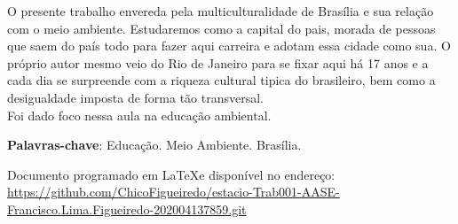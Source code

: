 
\setlength{\absparsep}{18pt} %
\begin{resumo}
 O presente trabalho envereda pela multiculturalidade de Brasília e sua relação com o meio ambiente. Estudaremos como a capital do pais, morada de pessoas que saem do país todo para fazer aqui carreira e adotam essa cidade como sua. O próprio autor mesmo veio do Rio de Janeiro para se fixar aqui há 17 anos e a cada dia se surpreende com a riqueza cultural tipica do brasileiro, bem como a desigualdade imposta de forma tão transversal. \\
 Foi dado foco nessa aula na educação ambiental.

 \textbf{Palavras-chave}: Educação. Meio Ambiente. Brasília.
\end{resumo}

Documento programado em \LaTeX  e disponível no endereço: \href{https://github.com/ChicoFigueiredo/estacio-Trab001-AASE-Francisco.Lima.Figueiredo-202004137859.git}{https://github.com/ChicoFigueiredo/estacio-Trab001-AASE-Francisco.Lima.Figueiredo-202004137859.git}\\

